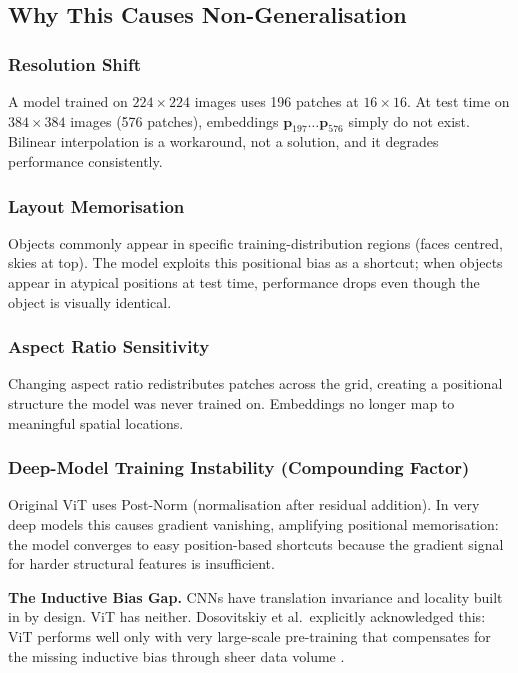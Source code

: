 \documentclass[12pt,a4paper]{article}
\begin{document}
\subsection{Why This Causes Non-Generalisation}

\subsubsection{Resolution Shift}
A model trained on $224\!\times\!224$ images uses 196 patches at $16\!\times\!16$.
At test time on $384\!\times\!384$ images (576 patches), embeddings
$\mathbf{p}_{197}\ldots\mathbf{p}_{576}$ simply do not exist. Bilinear
interpolation is a workaround, not a solution, and it degrades performance
consistently.

\subsubsection{Layout Memorisation}
Objects commonly appear in specific training-distribution regions (faces
centred, skies at top). The model exploits this positional bias as a shortcut;
when objects appear in atypical positions at test time, performance drops even
though the object is visually identical.

\subsubsection{Aspect Ratio Sensitivity}
Changing aspect ratio redistributes patches across the grid, creating a
positional structure the model was never trained on. Embeddings no longer map
to meaningful spatial locations.

\subsubsection{Deep-Model Training Instability (Compounding Factor)}
Original ViT uses Post-Norm (normalisation after residual addition).
In very deep models this causes gradient vanishing, amplifying positional
memorisation: the model converges to easy position-based shortcuts because the
gradient signal for harder structural features is insufficient.

\begin{callout}
  \textbf{The Inductive Bias Gap.} CNNs have translation invariance and
  locality built in by design. ViT has neither. Dosovitskiy et al.\
  explicitly acknowledged this: ViT performs well only with very large-scale
  pre-training that compensates for the missing inductive bias through sheer
  data volume \cite{vit2020}.
\end{callout}
\end{document}
